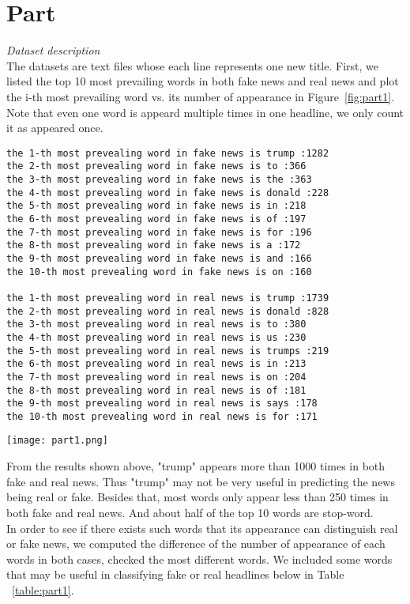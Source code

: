 \documentclass{article}
\newcommand{\enterProblemHeader}[1]{
}
\newcommand{\exitProblemHeader}[1]{
}
\newcounter{homeworkProblemCounter} %
\newcommand{\homeworkProblemName}{}
\newenvironment{homeworkProblem}[1][Part \arabic{homeworkProblemCounter}]{ %
\stepcounter{homeworkProblemCounter} %
\renewcommand{\homeworkProblemName}{#1} %
\section{\homeworkProblemName} %
\enterProblemHeader{\homeworkProblemName} %
}{
\exitProblemHeader{\homeworkProblemName} %
}
\begin{document}
\begin{homeworkProblem}

\noindent \textit{Dataset description}
\\[10pt]
The datasets are text files whose each line represents one new title. First, we listed the top 10 most prevailing words in both fake news and real news and plot the i-th most prevailing word vs. its number of appearance in Figure~\ref{fig:part1}. Note that even one word is appeard multiple times in one headline, we only count it as appeared once.\\
\begin{lstlisting}
the 1-th most prevealing word in fake news is trump :1282
the 2-th most prevealing word in fake news is to :366
the 3-th most prevealing word in fake news is the :363
the 4-th most prevealing word in fake news is donald :228
the 5-th most prevealing word in fake news is in :218
the 6-th most prevealing word in fake news is of :197
the 7-th most prevealing word in fake news is for :196
the 8-th most prevealing word in fake news is a :172
the 9-th most prevealing word in fake news is and :166
the 10-th most prevealing word in fake news is on :160

the 1-th most prevealing word in real news is trump :1739
the 2-th most prevealing word in real news is donald :828
the 3-th most prevealing word in real news is to :380
the 4-th most prevealing word in real news is us :230
the 5-th most prevealing word in real news is trumps :219
the 6-th most prevealing word in real news is in :213
the 7-th most prevealing word in real news is on :204
the 8-th most prevealing word in real news is of :181
the 9-th most prevealing word in real news is says :178
the 10-th most prevealing word in real news is for :171
\end{lstlisting}

\begin{figure*}[!ht]
\centering
\texttt{[image: part1.png]}
\caption{the i-th most prevailing word vs. its number of appearance}
\label{fig:part1}
\end{figure*}

From the results shown above, "trump" appears more than 1000 times in both fake and real news. Thus "trump" may not be very useful in predicting the news being real or fake. Besides that, most words only appear less than 250 times in both fake and real news. And about half of the top 10 words are stop-word.\\

In order to see if there exists such words that its appearance can distinguish real or fake news, we computed the difference of the number of appearance of each words in both cases, checked the most different words. We included some words that may be useful in classifying fake or real headlines below in Table ~\ref{table:part1}.


\end{homeworkProblem}
\end{document}
